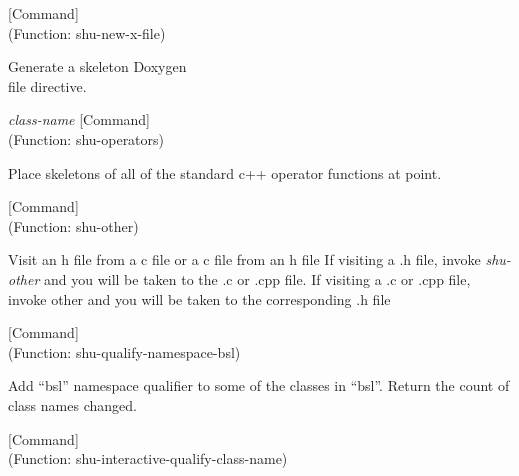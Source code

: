 \vspace{1em}
\noindent
{}
\usebox{\funcname}
 \hfill [Command]\\%
 (Function: shu-new-x-file)

\begin{doc-string}
Generate a skeleton Doxygen \\file directive.
\end{doc-string}

\vspace{1em}
\noindent
{}
\usebox{\funcname}\emph{class-name}
 \hfill [Command]\\%
 (Function: shu-operators)

\begin{doc-string}
Place skeletons of all of the standard c++ operator functions at point.
\end{doc-string}

\vspace{1em}
\noindent
{}
\usebox{\funcname}
 \hfill [Command]\\%
 (Function: shu-other)

\begin{doc-string}
Visit an h file from a c file or a c file from an h file
If visiting a .h file, invoke \emph{shu-other} and you will be taken to the
.c or .cpp file.  If visiting a .c or .cpp file, invoke other and you
will be taken to the corresponding .h file
\end{doc-string}

\vspace{1em}
\noindent
{}
\usebox{\funcname}
 \hfill [Command]\\%
 (Function: shu-qualify-namespace-bsl)

\begin{doc-string}
Add ``bsl'' namespace qualifier to some of the classes in ``bsl''.  Return the
count of class names changed.
\end{doc-string}

\vspace{1em}
\noindent
{}
\usebox{\funcname}
 \hfill [Command]\\%
 (Function: shu-interactive-qualify-class-name)

